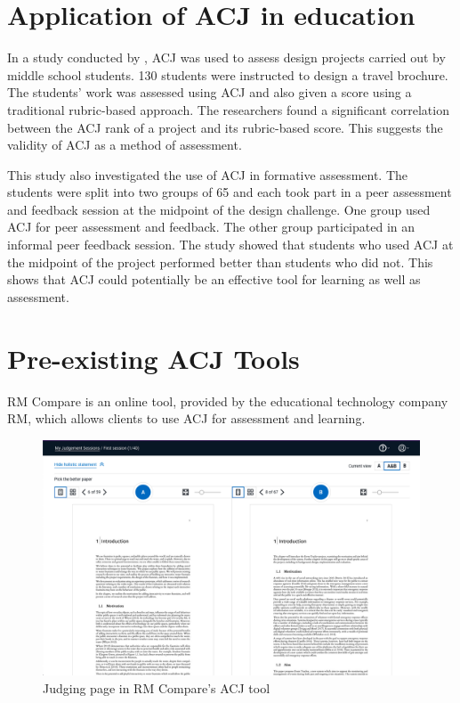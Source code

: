 \documentclass{l4proj}
\begin{document}
\section{Application of ACJ in education}
In a study conducted by \citet{bartholomew2019using}, ACJ was used to assess design projects carried out by middle school students. 130 students were instructed to design a travel brochure.
The students’ work was assessed using ACJ and also given a score using a traditional rubric-based approach. The researchers found a significant correlation between the ACJ rank of a project and its rubric-based score. This suggests the validity of ACJ as a method of assessment.

This study also investigated the use of ACJ in formative assessment. The students were split into two groups of 65 and each took part in a peer assessment and feedback session at the midpoint of the design challenge. One group used ACJ for peer assessment and feedback. The other group participated in an informal peer feedback session. The study showed that students who used ACJ at the midpoint of the project performed better than students who did not. This shows that ACJ could potentially be an effective tool for learning as well as assessment.

\section{Pre-existing ACJ Tools}

RM Compare is an online tool, provided by the educational technology company RM, which allows clients to use ACJ for assessment and learning. 

\begin{figure}[h]
\begin{center}
    \includegraphics[width=0.65\linewidth]{images/judging-rm-compare.png}    
    \caption{Judging page in RM Compare's ACJ tool \citep{rmcompare}}
\end{center}
\end{figure}
\end{document}
